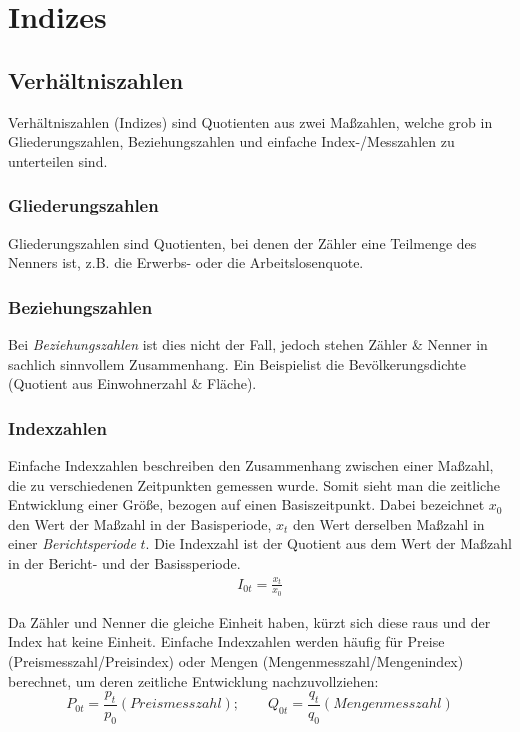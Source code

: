 \documentclass[a4paper]{article}
\begin{document}
\clearpage


\section{Indizes}\label{chap:index}
\subsection{Verhältniszahlen}
Verhältniszahlen (Indizes) sind Quotienten aus zwei Maßzahlen, welche grob in Gliederungszahlen, Beziehungszahlen und einfache Index-/Messzahlen zu unterteilen sind.

\subsubsection{Gliederungszahlen}
Gliederungszahlen sind Quotienten, bei denen der Zähler eine Teilmenge des Nenners ist, z.B. die Erwerbs- oder die Arbeitslosenquote.

\subsubsection{Beziehungszahlen}
Bei \textit{Beziehungszahlen} ist dies nicht der Fall, jedoch stehen Zähler \& Nenner in sachlich sinnvollem Zusammenhang. Ein Beispielist die Bevölkerungsdichte (Quotient aus Einwohnerzahl \& Fläche).

\subsubsection{Indexzahlen}
Einfache Indexzahlen beschreiben den Zusammenhang zwischen einer Maßzahl, die zu verschiedenen Zeitpunkten gemessen wurde. Somit sieht man die zeitliche Entwicklung einer Größe, bezogen auf einen Basiszeitpunkt.
Dabei bezeichnet $x_0$ den Wert der Maßzahl in der Basisperiode, $x_t$ den Wert derselben Maßzahl in einer \textit{Berichtsperiode} $t$. Die Indexzahl ist der Quotient aus dem Wert der Maßzahl in der Bericht- und der Basissperiode.
\begin{align*}
    I_{0t}=\frac{x_t}{x_0}
\end{align*}

\noindent Da Zähler und Nenner die gleiche Einheit haben, kürzt sich diese raus und der Index hat keine Einheit. Einfache Indexzahlen werden häufig für Preise (Preismesszahl/Preisindex) oder Mengen (Mengenmesszahl/Mengenindex) berechnet, um deren zeitliche Entwicklung nachzuvollziehen: 
$$P_{0t}=\frac{p_t}{p_0} (Preismesszahl);\qquad
    Q_{0t}=\frac{q_t}{q_0} (Mengenmesszahl)$$
\end{document}
